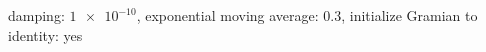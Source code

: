 damping: $\num[scientific-notation=true]{1e-10}$, exponential moving average: $\num[scientific-notation=true]{0.3}$, initialize Gramian to identity: yes